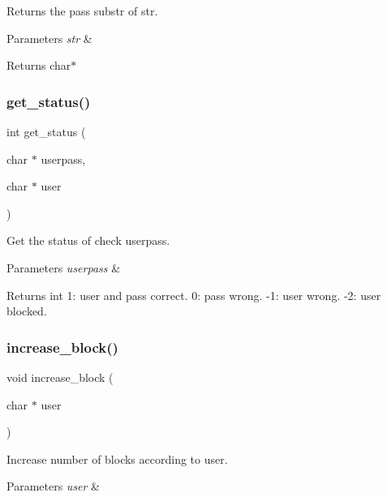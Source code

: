 Returns the pass substr of str. 


\begin{DoxyParams}{Parameters}
{\em str} & \\
\hline
\end{DoxyParams}
\begin{DoxyReturn}{Returns}
char$\ast$ 
\end{DoxyReturn}
\mbox{\label{auth_8h_ac2d257768c5b44d17c6fe989707468a5}} 
\subsubsection{get\+\_\+status()}
{\footnotesize\ttfamily int get\+\_\+status (\begin{DoxyParamCaption}\item[{char $\ast$}]{userpass,  }\item[{char $\ast$}]{user }\end{DoxyParamCaption})}



Get the status of check userpass. 


\begin{DoxyParams}{Parameters}
{\em userpass} & \\
\hline
\end{DoxyParams}
\begin{DoxyReturn}{Returns}
int 1\+: user and pass correct. 0\+: pass wrong. -\/1\+: user wrong. -\/2\+: user blocked. 
\end{DoxyReturn}
\mbox{\label{auth_8h_a7262d58710ad875161637d4d2ae75009}} 
\subsubsection{increase\+\_\+block()}
{\footnotesize\ttfamily void increase\+\_\+block (\begin{DoxyParamCaption}\item[{char $\ast$}]{user }\end{DoxyParamCaption})}



Increase number of blocks according to user. 


\begin{DoxyParams}{Parameters}
{\em user} & \\
\hline
\end{DoxyParams}
\mbox{\label{auth_8h_a45125798b5e6b7446e4f699ff5d5ce7e}} 
